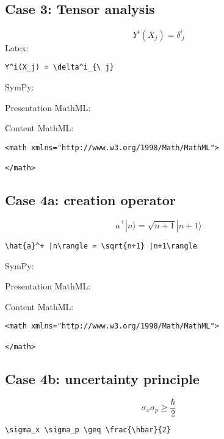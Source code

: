\subsection{Case 3: Tensor analysis}
\begin{equation}
Y^i(X_j) = \delta^i_{\ j}
\label{eq:tensor_analysis_case3}
\end{equation}
Latex: 
\begin{verbatim}
Y^i(X_j) = \delta^i_{\ j}
\end{verbatim}

SymPy:



Presentation MathML:


Content MathML:
\begin{verbatim}
<math xmlns="http://www.w3.org/1998/Math/MathML">

</math>
\end{verbatim}


\subsection{Case 4a: creation operator}
\begin{equation}
\hat{a}^+ |n\rangle = \sqrt{n+1} |n+1\rangle
\label{eq:creation_operator_case4a}
\end{equation}

\begin{verbatim}
\hat{a}^+ |n\rangle = \sqrt{n+1} |n+1\rangle
\end{verbatim}

SymPy:



Presentation MathML:


Content MathML:
\begin{verbatim}
<math xmlns="http://www.w3.org/1998/Math/MathML">

</math>
\end{verbatim}

\subsection{Case 4b: uncertainty principle}
\begin{equation}
\sigma_x \sigma_p \geq \frac{\hbar}{2}
\label{eq:uncertainty_principle_case4b}
\end{equation}

\begin{verbatim}
\sigma_x \sigma_p \geq \frac{\hbar}{2}
\end{verbatim}

